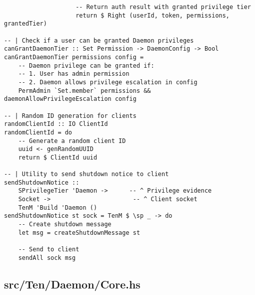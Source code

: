 \documentclass{article}
\begin{document}
\begin{tcolorbox}[title=Ten/Daemon/Server.hs Changes]
\begin{verbatim}
                    -- Return auth result with granted privilege tier
                    return $ Right (userId, token, permissions, grantedTier)

-- | Check if a user can be granted Daemon privileges
canGrantDaemonTier :: Set Permission -> DaemonConfig -> Bool
canGrantDaemonTier permissions config =
    -- Daemon privilege can be granted if:
    -- 1. User has admin permission
    -- 2. Daemon allows privilege escalation in config
    PermAdmin `Set.member` permissions && daemonAllowPrivilegeEscalation config

-- | Random ID generation for clients
randomClientId :: IO ClientId
randomClientId = do
    -- Generate a random client ID
    uuid <- genRandomUUID
    return $ ClientId uuid

-- | Utility to send shutdown notice to client
sendShutdownNotice ::
    SPrivilegeTier 'Daemon ->      -- ^ Privilege evidence
    Socket ->                       -- ^ Client socket
    TenM 'Build 'Daemon ()
sendShutdownNotice st sock = TenM $ \sp _ -> do
    -- Create shutdown message
    let msg = createShutdownMessage st

    -- Send to client
    sendAll sock msg
\end{verbatim}
\end{tcolorbox}

\subsection{src/Ten/Daemon/Core.hs}
\end{document}
